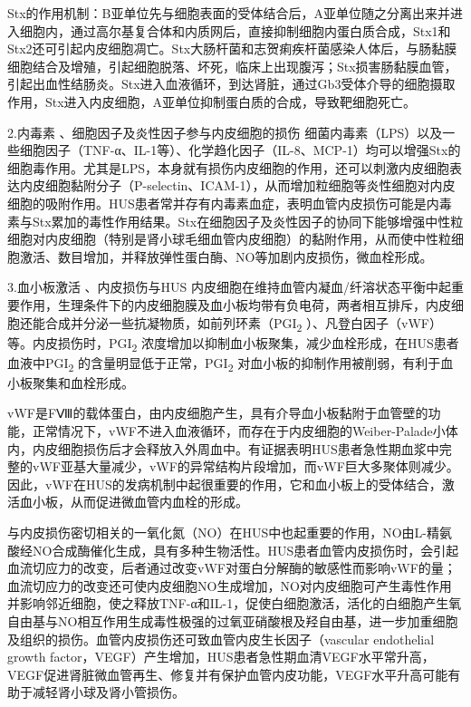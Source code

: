 Stx的作用机制：B亚单位先与细胞表面的受体结合后，A亚单位随之分离出来并进入细胞内，通过高尔基复合体和内质网后，直接抑制细胞内蛋白质合成，Stx1和Stx2还可引起内皮细胞凋亡。Stx大肠杆菌和志贺痢疾杆菌感染人体后，与肠黏膜细胞结合及增殖，引起细胞脱落、坏死，临床上出现腹泻；Stx损害肠黏膜血管，引起出血性结肠炎。Stx进入血液循环，到达肾脏，通过Gb3受体介导的细胞摄取作用，Stx进入内皮细胞，A亚单位抑制蛋白质的合成，导致靶细胞死亡。

2.内毒素 、细胞因子及炎性因子参与内皮细胞的损伤
细菌内毒素（LPS）以及一些细胞因子（TNF-α、IL-1等）、化学趋化因子（IL-8、MCP-1）均可以增强Stx的细胞毒作用。尤其是LPS，本身就有损伤内皮细胞的作用，还可以刺激内皮细胞表达内皮细胞黏附分子（P-selectin、ICAM-1），从而增加粒细胞等炎性细胞对内皮细胞的吸附作用。HUS患者常并存有内毒素血症，表明血管内皮损伤可能是内毒素与Stx累加的毒性作用结果。Stx在细胞因子及炎性因子的协同下能够增强中性粒细胞对内皮细胞（特别是肾小球毛细血管内皮细胞）的黏附作用，从而使中性粒细胞激活、数目增加，并释放弹性蛋白酶、NO等加剧内皮损伤，微血栓形成。

3.血小板激活 、内皮损伤与HUS
内皮细胞在维持血管内凝血/纤溶状态平衡中起重要作用，生理条件下的内皮细胞膜及血小板均带有负电荷，两者相互排斥，内皮细胞还能合成并分泌一些抗凝物质，如前列环素（PGI\textsubscript{2}
）、凡登白因子（vWF）等。内皮损伤时，PGI\textsubscript{2}
浓度增加以抑制血小板聚集，减少血栓形成，在HUS患者血液中PGI\textsubscript{2}
的含量明显低于正常，PGI\textsubscript{2}
对血小板的抑制作用被削弱，有利于血小板聚集和血栓形成。

vWF是FⅧ的载体蛋白，由内皮细胞产生，具有介导血小板黏附于血管壁的功能，正常情况下，vWF不进入血液循环，而存在于内皮细胞的Weiber-Palade小体内，内皮细胞损伤后才会释放入外周血中。有证据表明HUS患者急性期血浆中完整的vWF亚基大量减少，vWF的异常结构片段增加，而vWF巨大多聚体则减少。因此，vWF在HUS的发病机制中起很重要的作用，它和血小板上的受体结合，激活血小板，从而促进微血管内血栓的形成。

与内皮损伤密切相关的一氧化氮（NO）在HUS中也起重要的作用，NO由L-精氨酸经NO合成酶催化生成，具有多种生物活性。HUS患者血管内皮损伤时，会引起血流切应力的改变，后者通过改变vWF对蛋白分解酶的敏感性而影响vWF的量；血流切应力的改变还可使内皮细胞NO生成增加，NO对内皮细胞可产生毒性作用并影响邻近细胞，使之释放TNF-α和IL-1，促使白细胞激活，活化的白细胞产生氧自由基与NO相互作用生成毒性极强的过氧亚硝酸根及羟自由基，进一步加重细胞及组织的损伤。血管内皮损伤还可致血管内皮生长因子（vascular
endothelial growth
factor，VEGF）产生增加，HUS患者急性期血清VEGF水平常升高，VEGF促进肾脏微血管再生、修复并有保护血管内皮功能，VEGF水平升高可能有助于减轻肾小球及肾小管损伤。

